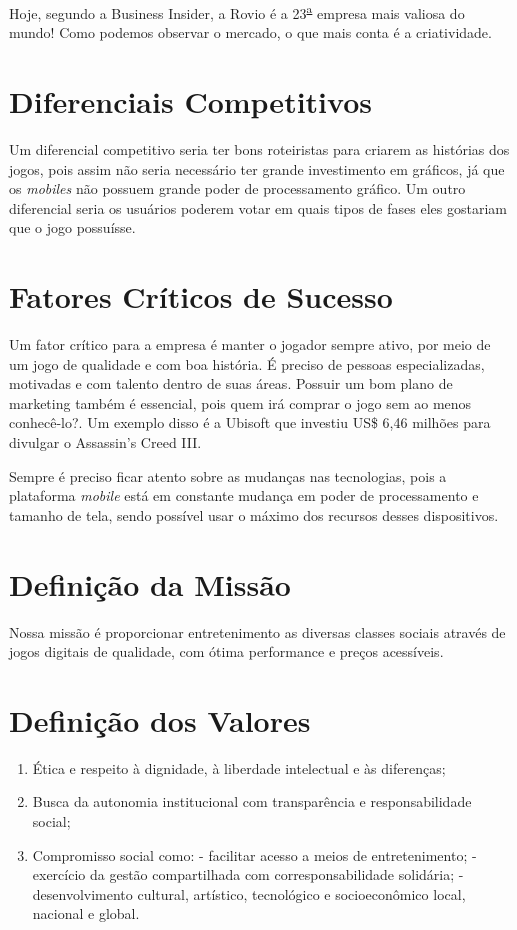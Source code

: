 \documentclass{abnt}
\begin{document}
		Hoje, segundo a Business Insider, a Rovio\textsuperscript{\texttrademark} é a  23\textsuperscript{\underline{a}} empresa mais valiosa do mundo!
	Como podemos observar o mercado, o que mais conta é a criatividade.

	\chapter {Diferenciais Competitivos}
		Um diferencial competitivo seria ter bons roteiristas para criarem as histórias dos jogos, pois assim não seria necessário ter grande investimento em gráficos, já que os \textit{mobiles} não possuem grande poder de processamento gráfico.
		Um outro diferencial seria os usuários poderem votar em quais tipos de fases eles gostariam que o jogo possuísse.
	\chapter {Fatores Críticos de Sucesso}
		Um fator crítico para a empresa é manter o jogador sempre ativo, por meio de um jogo de qualidade e com boa história.
		É preciso de pessoas especializadas, motivadas e com talento dentro de suas áreas.
		Possuir um bom plano de marketing também é essencial, pois quem irá comprar o jogo sem ao menos conhecê-lo?. Um exemplo disso é a Ubisoft\textsuperscript{\texttrademark} que investiu US\$ 6,46 milhões para divulgar o Assassin's Creed III.
	
		Sempre é preciso ficar atento sobre as mudanças nas tecnologias, pois a plataforma \textit{mobile} está em constante mudança em poder de processamento e tamanho de tela, sendo possível usar o máximo dos recursos desses dispositivos. 

	\chapter {Definição da Missão}
	
		Nossa missão é proporcionar entretenimento as diversas classes sociais através 
		de jogos digitais de qualidade, com ótima performance e preços acessíveis.
	
	\chapter {Definição dos Valores}
	
		\begin{enumerate}
			\item Ética e respeito à dignidade, à liberdade intelectual e às diferenças;
			\item Busca da autonomia institucional com transparência e responsabilidade social;
			\item Compromisso social como:
				\subitem - facilitar acesso a meios de entretenimento;
				\subitem - exercício da gestão compartilhada com corresponsabilidade solidária;
				\subitem - desenvolvimento cultural, artístico, tecnológico e socioeconômico local, nacional e global.
		\end{enumerate}
			
\end{document}
